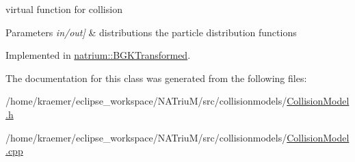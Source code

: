 virtual function for collision 


\begin{DoxyParams}{\-Parameters}
{\em in/out\mbox{]}} & distributions the particle distribution functions \\
\hline
\end{DoxyParams}


\-Implemented in \hyperlink{classnatrium_1_1BGKTransformed_a6ad393c3fde6ccc10e1de644dd7767e9}{natrium\-::\-B\-G\-K\-Transformed}.



\-The documentation for this class was generated from the following files\-:\begin{DoxyCompactItemize}
\item 
/home/kraemer/eclipse\-\_\-workspace/\-N\-A\-Triu\-M/src/collisionmodels/\hyperlink{CollisionModel_8h}{\-Collision\-Model.\-h}\item 
/home/kraemer/eclipse\-\_\-workspace/\-N\-A\-Triu\-M/src/collisionmodels/\hyperlink{CollisionModel_8cpp}{\-Collision\-Model.\-cpp}\end{DoxyCompactItemize}
